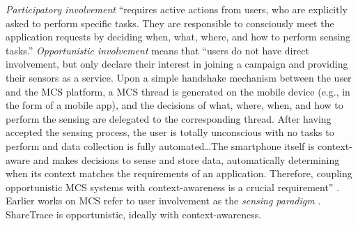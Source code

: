 \emph{Participatory involvement} ``requires active actions from users, who are explicitly asked to perform specific tasks. They are responsible to consciously meet the application requests by deciding when, what, where, and how to perform sensing tasks.'' \emph{Opportunistic involvement} means that ``users do not have direct involvement, but only declare their interest in joining a campaign and providing their sensors as a service. Upon a simple handshake mechanism between the user and the MCS platform, a MCS thread is generated on the mobile device (e.g., in the form of a mobile app), and the decisions of what, where, when, and how to perform the sensing are delegated to the corresponding thread. After having accepted the sensing process, the user is totally unconscious with no tasks to perform and data collection is fully automated{\ldots}The smartphone itself is context-aware and makes decisions to sense and store data, automatically determining when its context matches the requirements of an application. Therefore, coupling opportunistic MCS systems with context-awareness is a crucial requirement'' \citep{Capponi2019}. Earlier works on MCS refer to user involvement as the \emph{sensing paradigm} \citep{Lane2010, Ganti2011, Ma2014}. ShareTrace is opportunistic, ideally with context-awareness.

